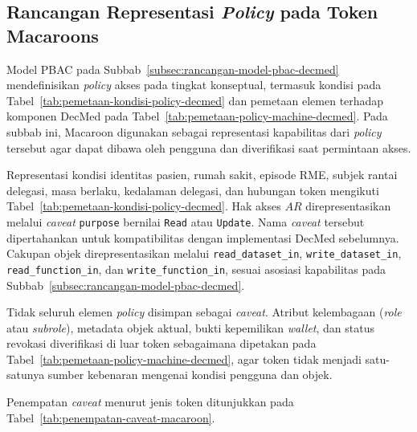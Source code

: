 \subsection{Rancangan Representasi \textit{Policy} pada Token Macaroons}
\label{subsec:rancangan-token-macaroons}

Model PBAC pada Subbab~\ref{subsec:rancangan-model-pbac-decmed} mendefinisikan \textit{policy} akses pada tingkat konseptual, termasuk kondisi pada Tabel~\ref{tab:pemetaan-kondisi-policy-decmed} dan pemetaan elemen terhadap komponen DecMed pada Tabel~\ref{tab:pemetaan-policy-machine-decmed}. Pada subbab ini, Macaroon digunakan sebagai representasi kapabilitas dari \textit{policy} tersebut agar dapat dibawa oleh pengguna dan diverifikasi saat permintaan akses.

Representasi kondisi identitas pasien, rumah sakit, episode RME, subjek rantai delegasi, masa berlaku, kedalaman delegasi, dan hubungan token mengikuti Tabel~\ref{tab:pemetaan-kondisi-policy-decmed}. Hak akses $AR$ direpresentasikan melalui \textit{caveat} \texttt{purpose} bernilai \texttt{Read} atau \texttt{Update}. Nama \textit{caveat} tersebut dipertahankan untuk kompatibilitas dengan implementasi DecMed sebelumnya. Cakupan objek direpresentasikan melalui \texttt{read\_dataset\_in}, \texttt{write\_dataset\_in}, \texttt{read\_function\_in}, dan \texttt{write\_function\_in}, sesuai asosiasi kapabilitas pada Subbab~\ref{subsec:rancangan-model-pbac-decmed}.

Tidak seluruh elemen \textit{policy} disimpan sebagai \textit{caveat}. Atribut kelembagaan (\textit{role} atau \textit{subrole}), metadata objek aktual, bukti kepemilikan \textit{wallet}, dan status revokasi diverifikasi di luar token sebagaimana dipetakan pada Tabel~\ref{tab:pemetaan-policy-machine-decmed}, agar token tidak menjadi satu-satunya sumber kebenaran mengenai kondisi pengguna dan objek.

Penempatan \textit{caveat} menurut jenis token ditunjukkan pada Tabel~\ref{tab:penempatan-caveat-macaroon}.

